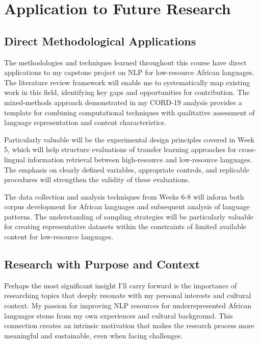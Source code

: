 \documentclass[
]{article}
\begin{document}
\section{Application to Future
Research}\label{application-to-future-research}

\subsection{Direct Methodological
Applications}\label{direct-methodological-applications}

The methodologies and techniques learned throughout this course have
direct applications to my capstone project on NLP for low-resource
African languages. The literature review framework will enable me to
systematically map existing work in this field, identifying key gaps and
opportunities for contribution. The mixed-methods approach demonstrated
in my CORD-19 analysis provides a template for combining computational
techniques with qualitative assessment of language representation and
content characteristics.

Particularly valuable will be the experimental design principles covered
in Week 5, which will help structure evaluations of transfer learning
approaches for cross-lingual information retrieval between high-resource
and low-resource languages. The emphasis on clearly defined variables,
appropriate controls, and replicable procedures will strengthen the
validity of these evaluations.

The data collection and analysis techniques from Weeks 6-8 will inform
both corpus development for African languages and subsequent analysis of
language patterns. The understanding of sampling strategies will be
particularly valuable for creating representative datasets within the
constraints of limited available content for low-resource languages.

\subsection{Research with Purpose and
Context}\label{research-with-purpose-and-context}

Perhaps the most significant insight I'll carry forward is the
importance of researching topics that deeply resonate with my personal
interests and cultural context. My passion for improving NLP resources
for underrepresented African languages stems from my own experiences and
cultural background. This connection creates an intrinsic motivation
that makes the research process more meaningful and sustainable, even
when facing challenges.
\end{document}
